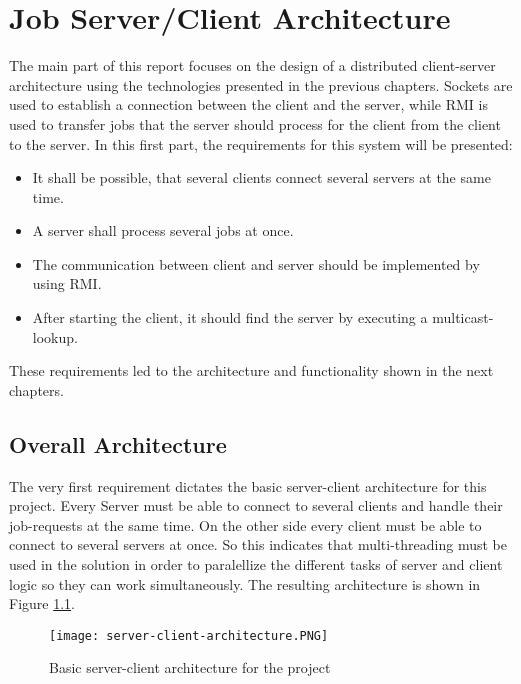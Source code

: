\chapter{Job Server/Client Architecture}
\label{job}
The main part of this report focuses on the design of a distributed client-server architecture using the technologies presented in the previous chapters. Sockets are used to establish a connection between the client and the server, while RMI is used to transfer jobs that the server should process for the client from the client to the server. In this first part, the requirements for this system will be presented:
\begin{itemize}
	\item It shall be possible, that several clients connect several servers at the same time.
	\item A server shall process several jobs at once.
	\item The communication between client and server should be implemented by using RMI.
	\item After starting the client, it should find the server by executing a multicast-lookup.
\end{itemize}
These requirements led to the architecture and functionality shown in the next chapters.
\section{Overall Architecture}
The very first requirement dictates the basic server-client architecture for this project. Every Server must be able to connect to several clients and handle their job-requests at the same time. On the other side every client must be able to connect to several servers at once. So this indicates that multi-threading must be used in the solution in order to paralellize the different tasks of server and client logic so they can work simultaneously. The resulting architecture is shown in Figure \ref{server-client-architecture}.
\begin{figure}[H]
	\centering
	\texttt{[image: server-client-architecture.PNG]}
	\caption{Basic server-client architecture for the project}
	\label{server-client-architecture}
\end{figure} 

